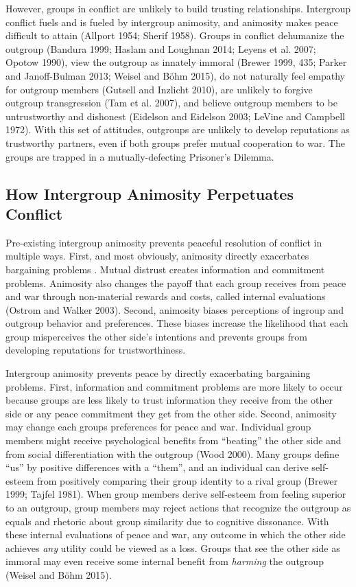 \documentclass[11pt]{article}
\begin{document}
However, groups in conflict are unlikely to build trusting
relationships. Intergroup conflict fuels and is fueled by intergroup
animosity, and animosity makes peace difficult to attain (Allport 1954;
Sherif 1958). Groups in conflict dehumanize the outgroup (Bandura 1999;
Haslam and Loughnan 2014; Leyens et al. 2007; Opotow 1990), view the
outgroup as innately immoral (Brewer 1999, 435; Parker and Janoff-Bulman
2013; Weisel and Böhm 2015), do not naturally feel empathy for outgroup
members (Gutsell and Inzlicht 2010), are unlikely to forgive outgroup
transgression (Tam et al. 2007), and believe outgroup members to be
untrustworthy and dishonest (Eidelson and Eidelson 2003; LeVine and
Campbell 1972). With this set of attitudes, outgroups are unlikely to
develop reputations as trustworthy partners, even if both groups prefer
mutual cooperation to war. The groups are trapped in a
mutually-defecting Prisoner's Dilemma.

\subsection{How Intergroup Animosity Perpetuates
Conflict}\label{how-intergroup-animosity-perpetuates-conflict}

Pre-existing intergroup animosity prevents peaceful resolution of
conflict in multiple ways. First, and most obviously, animosity directly
exacerbates bargaining problems . Mutual distrust creates information
and commitment problems. Animosity also changes the payoff that each
group receives from peace and war through non-material rewards and
costs, called internal evaluations (Ostrom and Walker 2003). Second,
animosity biases perceptions of ingroup and outgroup behavior and
preferences. These biases increase the likelihood that each group
misperceives the other side's intentions and prevents groups from
developing reputations for trustworthiness.

Intergroup animosity prevents peace by directly exacerbating bargaining
problems. First, information and commitment problems are more likely to
occur because groups are less likely to trust information they receive
from the other side or any peace commitment they get from the other
side. Second, animosity may change each groups preferences for peace and
war. Individual group members might receive psychological benefits from
``beating'' the other side and from social differentiation with the
outgroup (Wood 2000). Many groups define ``us'' by positive differences
with a ``them'', and an individual can derive self-esteem from
positively comparing their group identity to a rival group (Brewer 1999;
Tajfel 1981). When group members derive self-esteem from feeling
superior to an outgroup, group members may reject actions that recognize
the outgroup as equals and rhetoric about group similarity due to
cognitive dissonance. With these internal evaluations of peace and war,
any outcome in which the other side achieves \emph{any} utility could be
viewed as a loss. Groups that see the other side as immoral may even
receive some internal benefit from \emph{harming} the outgroup (Weisel
and Böhm 2015).
\end{document}
